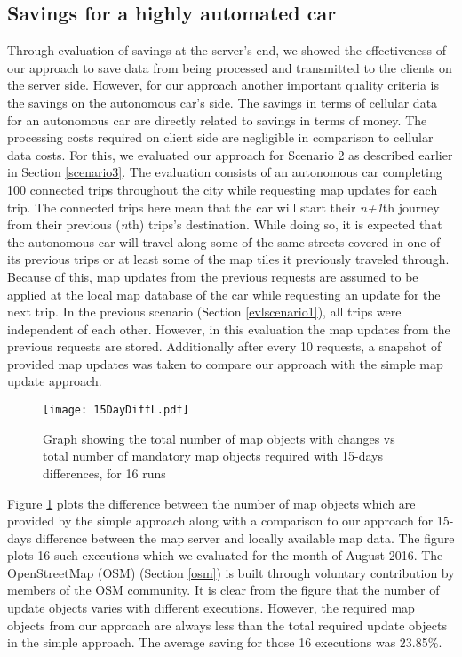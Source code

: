 \subsection{Savings for a highly automated car}
Through evaluation of savings at the server's end, we showed the effectiveness of our approach to save data from being processed and transmitted to the clients on the server side. However, for our approach another important quality criteria is the savings on the autonomous car's side. The savings in terms of cellular data for an autonomous car are directly related to savings in terms of money. The processing costs required on client side are negligible in comparison to cellular data costs. For this, we evaluated our approach for Scenario 2 as described earlier in Section \ref{scenario3}. The evaluation consists of an autonomous car completing 100 connected trips throughout the city while requesting map updates for each trip. The connected trips here mean that the car will start their \textit{n+1}th journey from their previous (\textit{n}th) trips's destination. While doing so, it is expected that the autonomous car will travel along some of the same streets covered in one of its previous trips or at least some of the map tiles it previously traveled through. Because of this, map updates from the previous requests are assumed to be applied at the local map database of the car while requesting an update for the next trip. In the previous scenario (Section \ref{evlscenario1}), all trips were independent of each other. However, in this evaluation the map updates from the previous requests are stored. Additionally after every 10 requests, a snapshot of provided map updates was taken to compare our approach with the simple map update approach. \\

\begin{figure}
\centering
\texttt{[image: 15DayDiffL.pdf]}
\caption{Graph showing the total number of map objects with changes vs total number of mandatory map objects required with 15-days differences, for 16 runs}
\label{fg:16x15d}
\end{figure}

Figure \ref{fg:16x15d} plots the difference between the number of map objects which are provided by the simple approach along with a comparison to our approach for 15-days difference between the map server and locally available map data. The figure plots 16 such executions which we evaluated for the month of August 2016. The OpenStreetMap (OSM) (Section \ref{osm}) is built through voluntary contribution by members of the OSM community. It is clear from the figure that the number of update objects varies with different executions. However, the required map objects from our approach are always less than the total required update objects in the simple approach. The average saving for those 16 executions was 23.85\%. \\


